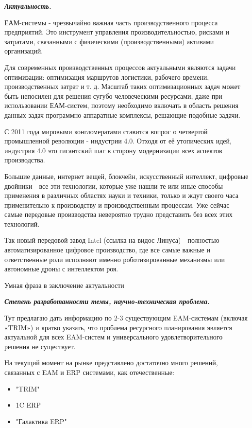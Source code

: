 
\textbf{\textit{Актуальность.}}

ЕАМ-системы - чрезвычайно важная часть производственного процесса предприятий. Это инструмент управления производительностью, рисками и затратами, связанными с физическими (производственными) активами организаций.

Для современных производственных процессов актуальными являются задачи
оптимизации: оптимизация маршрутов логистики, рабочего времени, производственных
затрат и т. д. Масштаб таких оптимизационных задач может быть непосилен для решения
сугубо человеческими ресурсами, даже при использовании ЕАМ-систем, поэтому необходимо включать в область решения данных задач программно-аппаратные комплексы, решающие подобные задачи.

С 2011 года мировыми конгломератами ставится вопрос о четвертой промышленной революции - индустрии 4.0. Отходя от её утопических идей, индустрия 4.0 это гигантский шаг в сторону модернизации всех аспектов производства.

Большие данные, интернет вещей, блокчейн, искусственный интеллект, цифровые двойники - все эти технологии, которые уже нашли те или иные способы применения в различных областях науки и техники, только и ждут своего часа применительно к производству и производственным процессам. Уже сейчас самые передовые производства невероятно трудно представить без всех этих технологий.

Так новый передовой завод Intel (ссылка на видос Линуса) - полностью автоматизированное цифровое производство, где все самые важные и ответственные роли исполняют именно роботизированные механизмы или автономные дроны с интеллектом роя.

Умная фраза в заключение актуальности


\textbf{\textit{Степень разработанности темы, научно-техническая проблема.}}

Тут предлагаю дать информацию по 2-3 существующим EAM-системам (включая «TRIM») и кратко указать, что проблема ресурсного планирования является актуальной для всех EAM-систем и универсального удовлетворительного решения не существует.

На текущий момент на рынке представлено достаточно много решений, связанных с EAM и ERP системами,  как отечественные:

\begin{itemize}
	\item "TRIM"
	\item 1C ERP
	\item "Галактика ERP"
\end{itemize}

